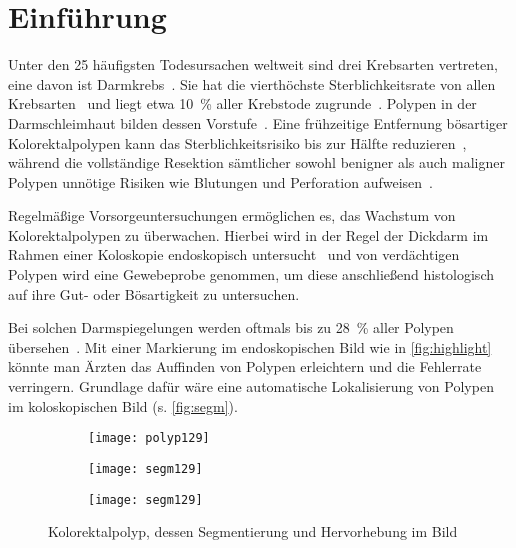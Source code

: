 \chapter{Einführung}

Unter den 25 häufigsten Todesursachen weltweit sind drei Krebsarten vertreten, eine davon ist Darmkrebs~\cite{Lozano.2012}.
Sie hat die vierthöchste Sterblichkeitsrate von allen Krebsarten~\cite{Ferlay.2012} und liegt etwa 10~\% aller Krebstode zugrunde~\cite{Kumar.2005}.
Polypen in der Darmschleimhaut bilden dessen Vorstufe~\cite{Kumar.2005}.
Eine frühzeitige Entfernung bösartiger Kolorektalpolypen kann das Sterblichkeitsrisiko bis zur Hälfte reduzieren~\cite{Zauber.2012}, während die vollständige Resektion sämtlicher sowohl benigner als auch maligner Polypen unnötige Risiken wie Blutungen und Perforation aufweisen~\cite{Rex.2009}.

Regelmäßige Vorsorgeuntersuchungen ermöglichen es, das Wachstum von Kolorektalpolypen zu überwachen.
Hierbei wird in der Regel der Dickdarm im Rahmen einer Koloskopie endoskopisch untersucht~\cite{Kumar.2005} und von verdächtigen Polypen wird eine Gewebeprobe genommen, um diese anschließend histologisch auf ihre Gut- oder Bösartigkeit zu untersuchen.

Bei solchen Darmspiegelungen werden oftmals bis zu 28~\% aller Polypen übersehen~\cite{Leufkens.2012}.
Mit einer Markierung im endoskopischen Bild wie in \autoref{fig:highlight} könnte man Ärzten das Auffinden von Polypen erleichtern und die Fehlerrate verringern.
Grundlage dafür wäre eine automatische Lokalisierung von Polypen im koloskopischen Bild (s. \autoref{fig:segm}).

\begin{figure}[ht]
	\begin{subfigure}{.3\textwidth}
		\centering
		\texttt{[image: polyp129]}
		\caption{}
		\label{fig:polyp}
	\end{subfigure}
	\begin{subfigure}{.3\textwidth}
		\centering
		\texttt{[image: segm129]}
		\caption{}
		\label{fig:segm}
	\end{subfigure}
	\begin{subfigure}{.3\textwidth}
		\centering
		\texttt{[image: segm129]}
		\caption{}
		\label{fig:highlight}
	\end{subfigure}
	\caption{Kolorektalpolyp, dessen Segmentierung und Hervorhebung im Bild~\cite{Vazquez.2017}}
	\label{fig:polypseg}
\end{figure}

